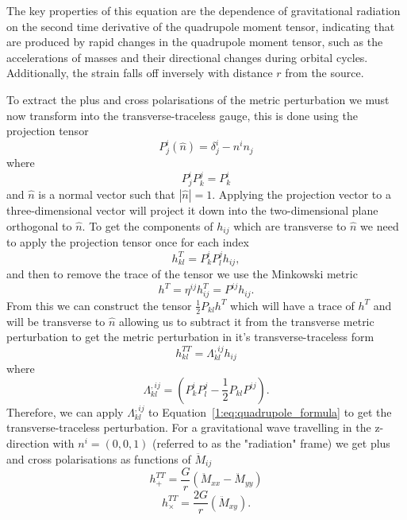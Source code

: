 The key properties of this equation are the dependence of gravitational radiation on the second time derivative of the quadrupole moment tensor, indicating that \gws are produced by rapid changes in the quadrupole moment tensor, such as the accelerations of masses and their directional changes during orbital cycles. Additionally, the \gwadj strain falls off inversely with distance $r$ from the source.

To extract the plus and cross polarisations of the metric perturbation we must now transform into the transverse-traceless gauge, this is done using the projection tensor~\cite{McIsaac_Thesis:2023}
%
\begin{equation}
    P^{i}_{j}(\hat{n}) = \delta^{i}_{j} - n^{i}n_{j}
\end{equation}
%
where
%
\begin{equation}
    P^{i}_{j}P^{j}_{k} = P^{i}_{k}
\end{equation}
%
and $\hat{n}$ is a normal vector such that $|\hat{n}| = 1$. Applying the projection vector to a three-dimensional vector will project it down into the two-dimensional plane orthogonal to $\hat{n}$. To get the components of $h_{ij}$ which are transverse to $\hat{n}$ we need to apply the projection tensor once for each index
%
\begin{equation}
    h^{T}_{kl} = P^{i}_{k}P^{j}_{l}h_{ij},
\end{equation}
%
and then to remove the trace of the tensor we use the Minkowski metric
%
\begin{equation}
    h^{T} = \eta^{ij}h^{T}_{ij} = P^{ij}h_{ij}.
\end{equation}
%
From this we can construct the tensor $\frac{1}{2}P_{kl}h^{T}$ which will have a trace of $h^{T}$ and will be transverse to $\hat{n}$ allowing us to subtract it from the transverse metric perturbation to get the metric perturbation in it's transverse-traceless form
%
\begin{equation}
    h^{TT}_{kl} = \Lambda^{,ij}_{kl} h_{ij} 
\end{equation}
%
where
%
\begin{equation}
    \Lambda^{,ij}_{kl} = \left(P^{i}_{k}P^{j}_{l} - \frac{1}{2}P_{kl}P^{ij}\right).
\end{equation}
%
Therefore, we can apply $\Lambda^{,ij}_{kl}$ to Equation~\ref{1:eq:quadrupole_formula} to get the transverse-traceless perturbation. For a gravitational wave travelling in the z-direction with $n^{i} = (0,0,1)$ (referred to as the "radiation" frame) we get plus and cross polarisations as functions of $\ddot{M}_{ij}$
%
\begin{equation}
    h_{+}^{TT} = \frac{G}{r}\left(\ddot{M}_{xx} - \ddot{M}_{yy}\right)
\end{equation}
%
\begin{equation}
    h_{\times}^{TT} = \frac{2G}{r}\left(\ddot{M}_{xy}\right).
\end{equation}

